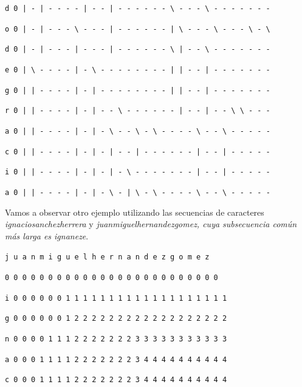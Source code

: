 \documentclass[11pt,a4paper]{article} %
\begin{document}
\texttt{d 0 | - | - - - - | - - | - - - - - - \textbackslash{ }- - - \textbackslash{ }- - - - - - -}

\texttt{o 0 | - | - - - \textbackslash{ }- - - | - - - - - - | \textbackslash{ }- - - \textbackslash{ }- - - \textbackslash{ }- \textbackslash}

\texttt{d 0 | - | - - - | - - - | - - - - - - \textbackslash{ }| - - \textbackslash{ }- - - - - - -}

\texttt{e 0 | \textbackslash{ }- - - - | - \textbackslash{ }- - - - - - - - | | - - | - - - - - - -}

\texttt{g 0 | | - - - - | - | - - - - - - - - | | - - | - - - - - - -}

\texttt{r 0 | | - - - - | - | - - \textbackslash{ }- - - - - - | - - | - - \textbackslash{ }\textbackslash{ }- - -}

\texttt{a 0 | | - - - - | - | - \textbackslash{ }- - \textbackslash{ }- \textbackslash{ }- - - - \textbackslash{ }- - \textbackslash{ }- - - - -}

\texttt{c 0 | | - - - - | - | - | - - | - - - - - - | - - | - - - - -}

\texttt{i 0 | | - - - - | - | - | - \textbackslash{ }- - - - - - - | - - | - - - - -}

\texttt{a 0 | | - - - - | - | - \textbackslash{ }- | \textbackslash{ }- \textbackslash{ }- - - - \textbackslash{ }- - \textbackslash{ }- - - - -}

\normalsize


Vamos a observar otro ejemplo utilizando las secuencias de caracteres \textit{ignaciosanchezherrera} y \textit{juanmiguelhernandezgomez, cuya subsecuencia común más larga es \textit{ignaneze}}.\\

\small

\hspace{1,72 em} \texttt{j u a n m i g u e l h e r n a n d e z g o m e z}

\hspace{0,71 em} \texttt{0 0 0 0 0 0 0 0 0 0 0 0 0 0 0 0 0 0 0 0 0 0 0 0 0}

\texttt{i 0 0 0 0 0 0 1 1 1 1 1 1 1 1 1 1 1 1 1 1 1 1 1 1 1}

\texttt{g 0 0 0 0 0 0 1 2 2 2 2 2 2 2 2 2 2 2 2 2 2 2 2 2 2}

\texttt{n 0 0 0 0 1 1 1 2 2 2 2 2 2 2 3 3 3 3 3 3 3 3 3 3 3}

\texttt{a 0 0 0 1 1 1 1 2 2 2 2 2 2 2 3 4 4 4 4 4 4 4 4 4 4}

\texttt{c 0 0 0 1 1 1 1 2 2 2 2 2 2 2 3 4 4 4 4 4 4 4 4 4 4}
\end{document}
